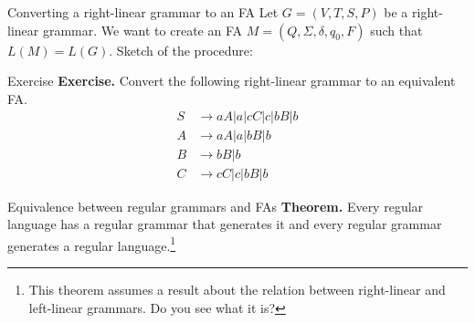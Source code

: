 \documentclass[10pt]{beamer}
\begin{document}
\begin{frame}[t]{Converting a right-linear grammar to an FA}
    Let $G = (V, T, S, P)$ be a right-linear grammar. We want to create an FA $M = (Q, \Sigma, \delta, q_0, F)$ such that $L(M) = L(G)$. Sketch of the procedure:
\end{frame}


\begin{frame}{Exercise}
    \textbf{Exercise.} Convert the following right-linear grammar to an equivalent FA.
    \begin{align*}
        S & \rightarrow aA|a|cC|c|bB|b \\
        A & \rightarrow aA|a|bB|b      \\
        B & \rightarrow bB|b           \\
        C & \rightarrow cC|c|bB|b
    \end{align*}
\end{frame}


\begin{frame}{Equivalence between regular grammars and FAs}
    \textbf{Theorem.} Every regular language has a regular grammar that generates it and every regular grammar generates a regular language.\footnote{This theorem assumes a result about the relation between right-linear and left-linear grammars. Do you see what it is?}
\end{frame}
\end{document}
